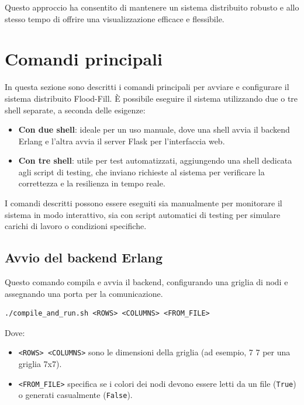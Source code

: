 \documentclass[12pt, a4paper]{report}
\begin{document}
Questo approccio ha consentito di mantenere un sistema distribuito robusto e allo stesso tempo di offrire una visualizzazione efficace e flessibile.

\section{Comandi principali}

In questa sezione sono descritti i comandi principali per avviare e configurare il sistema distribuito Flood-Fill. \`E possibile eseguire il sistema utilizzando due o tre shell separate, a seconda delle esigenze:
\begin{itemize}
  \item \textbf{Con due shell}: ideale per un uso manuale, dove una shell avvia il backend Erlang e l’altra avvia il server Flask per l’interfaccia web.
  \item \textbf{Con tre shell}: utile per test automatizzati, aggiungendo una shell dedicata agli script di testing, che inviano richieste al sistema per verificare la correttezza e la resilienza in tempo reale.
\end{itemize}

I comandi descritti possono essere eseguiti sia manualmente per monitorare il sistema in modo interattivo, sia con script automatici di testing per simulare carichi di lavoro o condizioni specifiche.

\subsection{Avvio del backend Erlang}
Questo comando compila e avvia il backend, configurando una griglia di nodi e assegnando una porta per la comunicazione. 

\newpage
\begin{tcolorbox}[title=Comandi di avvio in Erlang]
\begin{verbatim}
./compile_and_run.sh <ROWS> <COLUMNS> <FROM_FILE>
\end{verbatim}
\end{tcolorbox}

\noindent Dove:
\begin{itemize}
\item \texttt{<ROWS> <COLUMNS>} sono le dimensioni della griglia (ad esempio, 7 7 per una griglia 7x7).
\item \texttt{<FROM\_FILE>} specifica se i colori dei nodi devono essere letti da un file (\texttt{True}) o generati casualmente (\texttt{False}).
\end{itemize}
\end{document}
